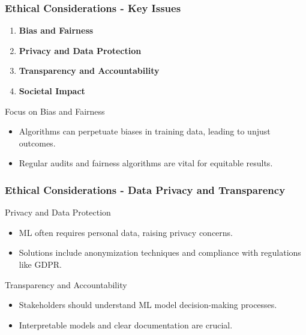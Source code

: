 \documentclass[aspectratio=169]{beamer}
\begin{document}
\begin{frame}[fragile]
    \frametitle{Ethical Considerations - Key Issues}
    \begin{enumerate}
        \item \textbf{Bias and Fairness}
        \item \textbf{Privacy and Data Protection}
        \item \textbf{Transparency and Accountability}
        \item \textbf{Societal Impact}
    \end{enumerate}
    
    \begin{block}{Focus on Bias and Fairness}
        \begin{itemize}
            \item Algorithms can perpetuate biases in training data, leading to unjust outcomes.
            \item Regular audits and fairness algorithms are vital for equitable results.
        \end{itemize}
    \end{block}
\end{frame}

\begin{frame}[fragile]
    \frametitle{Ethical Considerations - Data Privacy and Transparency}
    \begin{block}{Privacy and Data Protection}
        \begin{itemize}
            \item ML often requires personal data, raising privacy concerns.
            \item Solutions include anonymization techniques and compliance with regulations like GDPR.
        \end{itemize}
    \end{block}

    \begin{block}{Transparency and Accountability}
        \begin{itemize}
            \item Stakeholders should understand ML model decision-making processes.
            \item Interpretable models and clear documentation are crucial.
        \end{itemize}
    \end{block}
\end{frame}
\end{document}
